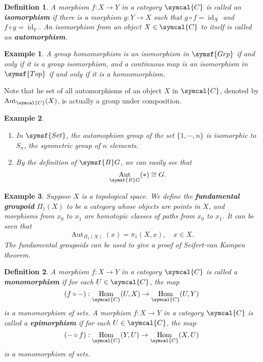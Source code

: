 \documentclass{article}
\theoremstyle{theorem}
\newtheorem{definition}{Definition}[section]
\newtheorem{example}{Example}[section]
\theoremstyle{remark}
\def\calC{{\symcal{C}}}
\DeclareMathOperator{\Hom}{Hom}
\DeclareMathOperator{\Aut}{Aut}
\DeclareMathOperator{\id}{id}
\begin{document}
\begin{definition}
    A morphism $f : X \to Y$ in a category $\calC$ is called an \textbf{isomorphism} if there is a morphism $g : Y \to X$ such that $g \circ f = \id_X$ and $f \circ g = \id_Y$. An isomorphism from an object $X \in \calC$ to itself is called an \textbf{automorphism}. 
\end{definition}

\begin{example}
    A group homomorphism is an isomorphism in $\symsf{Grp}$ if and only if it is a group isomorphism, and a continuous map is an isomorphism in $\symsf{Top}$ if and only if it is a homeomorphism. 
\end{example}

Note that he set of all automorphisms of an object $X$ in $\calC$, denoted by $\Aut_\calC(X)$, is actually a group under composition. 

\begin{example}
    \begin{enumerate}
        \item In $\symsf{Set}$, the automophism group of the set $\{1, \cdots, n\}$ is isomorphic to $S_n$, the symmetric group of $n$ elements. 
        \item By the definition of $\symsf{B}G$, we can easily see that $$\Aut_{\symsf{B}G}(\ast) \cong G.$$
    \end{enumerate}
\end{example}

\begin{example}
    Suppose $X$ is a topological space. We define the \textbf{fundamental groupoid} $\Pi_1(X)$ to be a category whose objects are points in $X$, and morphisms from $x_0$ to $x_1$ are homotopic classes of paths from $x_0$ to $x_1$. It can be seen that $$\Aut_{\Pi_1(X)}(x) = \pi_1(X, x), \quad x \in X.$$ The fundamental groupoids can be used to give a proof of Seifert-van Kampen theorem. 
\end{example}

\begin{definition}
    A morphism $f : X \to Y$ in a category $\calC$ is called a \textbf{monomorphism} if for each $U \in \calC$, the map $$(f \circ -) : \Hom_\calC(U, X) \to \Hom_\calC(U, Y)$$ is a monomorphism of sets. A morphism $f : X \to Y$ in a category $\calC$ is called a \textbf{epimorphism} if for each $U \in \calC$, the map $$(- \circ f) : \Hom_\calC(Y, U) \to \Hom_\calC(X, U)$$ is a monomorphism of sets. 
\end{definition}
\end{document}
